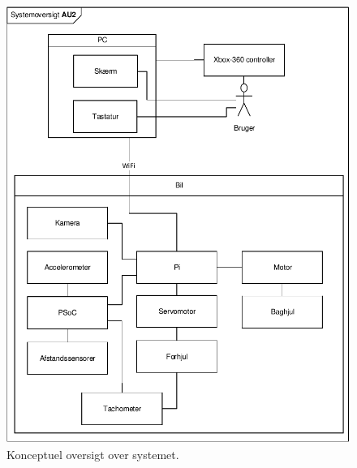 \clearpage

\begin{figure}[h]
\centering
\includegraphics[width=\textwidth * 1]{../fig/diagrammer/systemoversigt}
\caption{Konceptuel oversigt over systemet.}
\label{fig:systmeoversigt}
\end{figure}